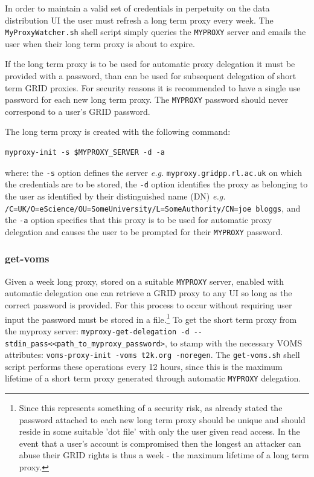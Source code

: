 \documentclass[11pt]{article}
\begin{document}
In order to maintain a valid set of credentials in perpetuity on the
data distribution UI the user must refresh a long term proxy every
week. The \verb+MyProxyWatcher.sh+ shell script simply queries the
\verb+MYPROXY+ server and emails the user when their long term proxy
is about to expire. 

If the long term proxy is to be used for automatic
proxy delegation it must be provided with a password, than can be used
for subsequent delegation of short term GRID proxies. For security
reasons it is recommended to have a single use password for each new
long term proxy. The \verb+MYPROXY+ password should never correspond
to a user's GRID password.

The long term proxy is created with the following command:
\begin{verbatim}
myproxy-init -s $MYPROXY_SERVER -d -a
\end{verbatim}
where: the \verb+-s+ option defines the server {\it e.g.}
\verb+myproxy.gridpp.rl.ac.uk+ on which the credentials are to be
stored, the \verb+-d+ option identifies the proxy as belonging to the
user as identified by their distinguished name (DN) {\it e.g.}
\verb+/C=UK/O=eScience/OU=SomeUniversity/L=SomeAuthority/CN=joe bloggs+, 
and the \verb+-a+ option specifies that this proxy is to be used for
automatic proxy delegation and causes the user to be prompted for
their \verb+MYPROXY+ password.

\subsubsection*{get-voms}

Given a week long proxy, stored on a suitable \verb+MYPROXY+ server,
enabled with automatic delegation one can retrieve a GRID proxy to any
UI so long as the correct password is provided. For this process to
occur without requiring user input the password must be stored in a
file.\footnote{Since this represents something of a security risk, as
  already stated the password attached to each new long term proxy
  should be unique and should reside in some suitable 'dot file' with
  only the user given read access. In the event that a user's account
  is compromised then the longest an attacker can abuse their GRID
  rights is thus a week - the maximum lifetime of a long term proxy.}
To get the short term proxy from the myproxy server:
\verb+myproxy-get-delegation -d --stdin_pass<<path_to_myproxy_password>+,
to stamp with the necessary VOMS attributes:
\verb+voms-proxy-init -voms t2k.org -noregen+. The \verb+get-voms.sh+
shell script performs these operations every 12 hours, since this is
the maximum lifetime of a short term proxy generated through automatic
\verb+MYPROXY+ delegation.
\end{document}
